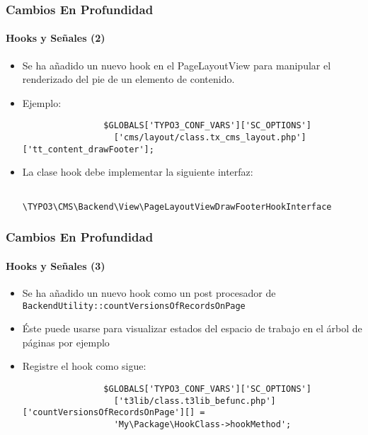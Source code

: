 \begin{frame}[fragile]
	\frametitle{Cambios En Profundidad}
	\framesubtitle{Hooks y Señales (2)}

	\begin{itemize}

		\item Se ha añadido un nuevo hook en el PageLayoutView para manipular el renderizado
			del pie de un elemento de contenido.

		\item Ejemplo:
			\begin{lstlisting}
				$GLOBALS['TYPO3_CONF_VARS']['SC_OPTIONS']
				  ['cms/layout/class.tx_cms_layout.php']['tt_content_drawFooter'];
			\end{lstlisting}

		\item La clase hook debe implementar la siguiente interfaz:
			\begin{lstlisting}
				\TYPO3\CMS\Backend\View\PageLayoutViewDrawFooterHookInterface
			\end{lstlisting}

	\end{itemize}

\end{frame}


\begin{frame}[fragile]
	\frametitle{Cambios En Profundidad}
	\framesubtitle{Hooks y Señales (3)}

	\begin{itemize}

		\item Se ha añadido un nuevo hook como un post procesador de
			\small
				\texttt{BackendUtility::countVersionsOfRecordsOnPage}
			\normalsize

		\item Éste puede usarse para visualizar estados del espacio de trabajo en el árbol de páginas por ejemplo
		\item Registre el hook como sigue:

			\begin{lstlisting}
				$GLOBALS['TYPO3_CONF_VARS']['SC_OPTIONS']
				  ['t3lib/class.t3lib_befunc.php']['countVersionsOfRecordsOnPage'][] =
				  'My\Package\HookClass->hookMethod';
			\end{lstlisting}

	\end{itemize}

\end{frame}

